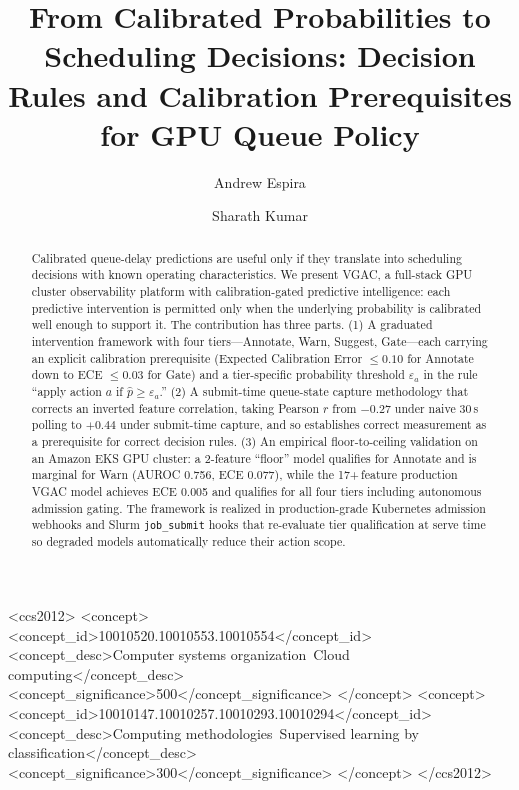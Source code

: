 \documentclass[sigconf]{acmart}
\begin{document}
\title{From Calibrated Probabilities to Scheduling Decisions:
       Decision Rules and Calibration Prerequisites for GPU Queue Policy}

\author{Andrew Espira}

\author{Sharath Kumar}

\renewcommand{\shortauthors}{Espira and Kumar}

\begin{abstract}
Calibrated queue-delay predictions are useful only if they translate into scheduling decisions with known operating characteristics. We present VGAC, a full-stack GPU cluster observability platform with calibration-gated predictive intelligence: each predictive intervention is permitted only when the underlying probability is calibrated well enough to support it. The contribution has three parts. (1) A graduated intervention framework with four tiers---Annotate, Warn, Suggest, Gate---each carrying an explicit calibration prerequisite (Expected Calibration Error $\le 0.10$ for Annotate down to ECE $\le 0.03$ for Gate) and a tier-specific probability threshold $\varepsilon_a$ in the rule ``apply action $a$ if $\hat{p} \ge \varepsilon_a$.'' (2) A submit-time queue-state capture methodology that corrects an inverted feature correlation, taking Pearson $r$ from $-0.27$ under naive 30\,s polling to $+0.44$ under submit-time capture, and so establishes correct measurement as a prerequisite for correct decision rules. (3) An empirical floor-to-ceiling validation on an Amazon EKS GPU cluster: a 2-feature ``floor'' model qualifies for Annotate and is marginal for Warn (AUROC 0.756, ECE 0.077), while the 17+\,feature production VGAC model achieves ECE 0.005 and qualifies for all four tiers including autonomous admission gating. The framework is realized in production-grade Kubernetes admission webhooks and Slurm \texttt{job\_submit} hooks that re-evaluate tier qualification at serve time so degraded models automatically reduce their action scope.
\end{abstract}

\begin{CCSXML}
<ccs2012>
<concept>
<concept_id>10010520.10010553.10010554</concept_id>
<concept_desc>Computer systems organization~Cloud computing</concept_desc>
<concept_significance>500</concept_significance>
</concept>
<concept>
<concept_id>10010147.10010257.10010293.10010294</concept_id>
<concept_desc>Computing methodologies~Supervised learning by classification</concept_desc>
<concept_significance>300</concept_significance>
</concept>
</ccs2012>
\end{CCSXML}
\end{document}
